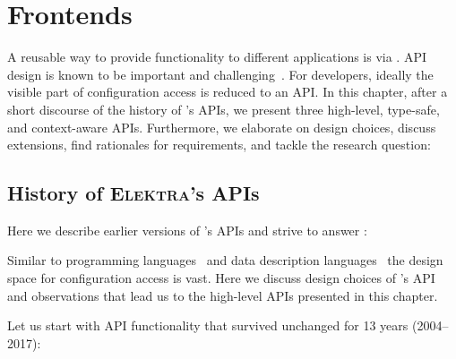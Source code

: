 \chapter{Frontends}
\label{chapter:frontend}

\chapterhung


A reusable way to provide functionality to different applications is via .
API design is known to be important and challenging~\cite{block2006api,grill2012methods,thomas2006api,burns2016borg,russell2008virtio}.
For developers, ideally the visible part of configuration access is reduced to an API.
In this chapter, after a short discourse of the history of \elektra{}'s APIs, we present three high-level, type-safe, and context-aware APIs.
Furthermore, we elaborate on design choices, discuss extensions, find rationales for requirements, and tackle the research question:
\rqFrontend*

\section{History of \textsc{Elektra}'s APIs}
\label{sec:api-history}

Here we describe earlier versions of \elektra{}'s APIs and strive to answer :
\rqFrontendDesignDecisions*

Similar to programming languages~\cite{landin1966next} and data description languages~\cite{fisher2010next} the design space for configuration access is vast.
Here we discuss design choices of \elektra{}'s API and observations that lead us to the high-level APIs presented in this chapter.




Let us start with API functionality that survived unchanged for 13 years (2004--2017):

